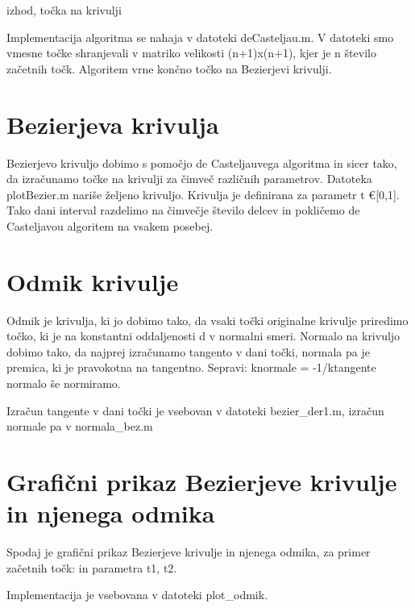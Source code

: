 \documentclass{article}
\begin{document}
izhod, točka na krivulji

Implementacija algoritma se nahaja v datoteki deCasteljau.m.
V datoteki smo vmesne točke shranjevali v matriko velikosti (n+1)x(n+1), kjer je n število začetnih točk. Algoritem vrne končno točko na Bezierjevi krivulji.


\section{Bezierjeva krivulja}
Bezierjevo krivuljo dobimo s pomočjo de Casteljauvega algoritma in sicer tako, da izračunamo točke na krivulji za čimveč različnih parametrov. 
Datoteka plotBezier.m nariše željeno krivuljo. Krivulja je definirana za parametr t €[0,1]. Tako dani interval razdelimo na čimvečje število delcev in pokličemo de Casteljavou algoritem na vsakem posebej.


\section{Odmik krivulje}
Odmik je krivulja, ki jo dobimo tako, da vsaki točki originalne krivulje
priredimo točko, ki je na konstantni oddaljenosti d v normalni smeri.
Normalo na krivuljo dobimo tako, da najprej izračunamo tangento v dani točki, normala pa je premica, ki je pravokotna na tangentno.
Sepravi:
knormale = -1/ktangente
normalo še normiramo.

Izračun tangente v dani točki je vsebovan v datoteki bezier\_der1.m, izračun normale pa v normala\_bez.m

\section{Grafični prikaz Bezierjeve krivulje in njenega odmika}

Spodaj je grafični prikaz Bezierjeve krivulje in njenega odmika, za primer začetnih točk: in parametra t1, t2.

Implementacija je vsebovana v datoteki plot\_odmik.
\end{document}
